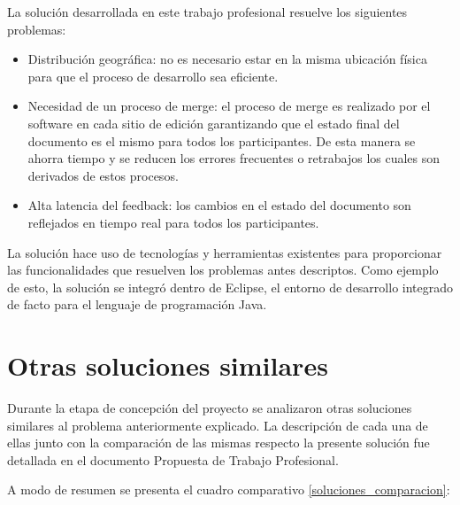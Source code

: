 \documentclass[12pt,a4paper]{article}
\begin{document}
La solución desarrollada en este trabajo profesional resuelve los siguientes problemas:

\begin{itemize}
	\item Distribución geográfica: no es necesario estar en la misma ubicación física para que el proceso
	de desarrollo sea eficiente.
	\item Necesidad de un proceso de merge: el proceso de merge es realizado por el software en cada
	sitio de edición garantizando que el estado final del documento es el mismo para todos los 
	participantes. De esta manera se ahorra tiempo y se reducen los errores frecuentes o retrabajos
	los cuales son derivados de estos procesos.
	\item Alta latencia del feedback: los cambios en el estado del documento son reflejados en tiempo 
	real para todos los participantes.
\end{itemize}

La solución hace uso de tecnologías y herramientas existentes para proporcionar las funcionalidades 
que resuelven los problemas antes descriptos. Como ejemplo de esto, la solución se integró dentro de
Eclipse, el entorno de desarrollo integrado de facto para el lenguaje de programación Java.

	\section{Otras soluciones similares}
Durante la etapa de concepción del proyecto se analizaron otras soluciones similares al problema
anteriormente explicado. La descripción de cada una de ellas junto con la comparación de las mismas
respecto la presente solución fue detallada en el documento Propuesta de Trabajo Profesional\cite{propuestatpprof}.

A modo de resumen se presenta el cuadro comparativo \ref{soluciones_comparacion}:
\end{document}
